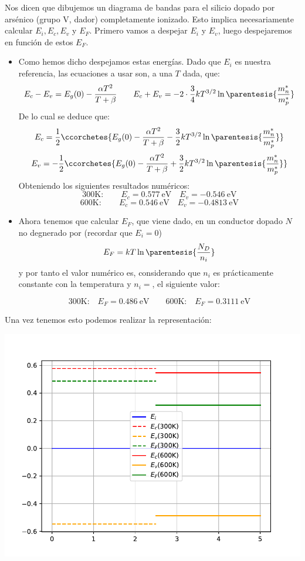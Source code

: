 
	Nos dicen que dibujemos un diagrama de bandas para el silicio dopado por arsénico (grupo V, dador) completamente ionizado. Esto implica necesariamente calcular $E_i,E_c,E_v$ y $E_F$. Primero vamos a despejar $E_i$ y $E_v$, luego despejaremos en función de estos $E_F$.

	\begin{itemize}
		\item Como hemos dicho despejamos estas energías. Dado que $E_i$ es nuestra referencia, las ecuaciones a usar son, a una $T$ dada, que:
		\begin{equation}
			E_c-E_v = E_g(0) - \frac{\alpha T^2}{T+\beta} \qquad E_c+E_v=-2 \cdot \frac{3}{4} kT^{3/2} \ln \parentesis{\frac{m_n^*}{m_p^*}}
		\end{equation}
		De lo cual se deduce que:
		\begin{equation}
			E_c = \frac{1}{2} \ccorchetes{E_g(0) - \frac{\alpha T^2}{T+\beta} - \frac{3}{2} kT^{3/2} \ln \parentesis{\frac{m_n^*}{m_p^*}}}
		\end{equation}
		\begin{equation}
			E_v = -\frac{1}{2} \ccorchetes{E_g(0) - \frac{\alpha T^2}{T+\beta} + \frac{3}{2} kT^{3/2} \ln \parentesis{\frac{m_n^*}{m_p^*}}}
		\end{equation}
		Obteniendo los siguientes resultados numéricos:
		\begin{equation}
			\text{300K}: \qquad
			E_c = 0.577 \ \text{eV} \quad E_v = -0.546 \ \text{eV}
		\end{equation}
		\begin{equation}
			\text{600K}: \qquad
			E_c = 0.546  \ \text{eV} \quad E_v = -0.4813 \ \text{eV}
		\end{equation}
		\item Ahora tenemos que calcular $E_F$, que viene dado, en un conductor dopado $N$ no degnerado por (recordar que $E_i=0$)
		\begin{equation}
			E_F = kT \ln \parentesis{\frac{N_D}{n_i}}
		\end{equation}
		y por tanto el valor numérico es, considerando que $n_i$ es prácticamente constante con la temperatura y $n_i=$, el siguiente valor:

		\begin{equation}
			\text{300K:}\quad
			E_F = 0.486 \ \text{eV} \qquad
			\text{600K:}\quad
			E_F= 0.3111 \ \text{eV}
		\end{equation}
	\end{itemize}
	Una vez tenemos esto podemos realizar la representación:
	\begin{center}
		\includegraphics[width=0.9\linewidth]{Cuerpo/Ch_01/Ejercicio_01_6.pdf}
	\end{center}
